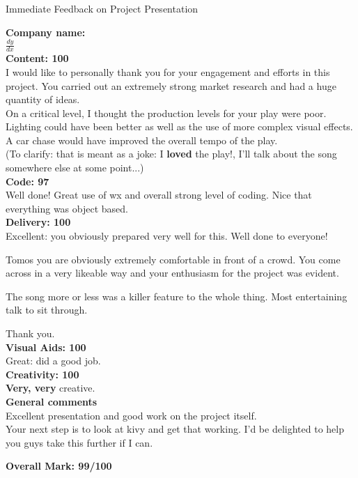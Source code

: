 \documentclass{article}
\begin{document}
\begin{center}
\Huge{Immediate Feedback on Project Presentation}\\
\end{center}


\normalsize
\textbf{Company name:}\\

$\frac{dy}{dx}$ \\

\textbf{Content: 100}\\

I would like to personally thank you for your engagement and efforts in this project.
You carried out an extremely strong market research and had a huge quantity of ideas.\\

On a critical level, I thought the production levels for your play were poor.
Lighting could have been better as well as the use of more complex visual effects.
A car chase would have improved the overall tempo of the play.\\

(To clarify: that is meant as a joke: I \textbf{loved} the play!, I'll talk about the song somewhere else at some point...)\\

\textbf{Code: 97}\\

Well done!
Great use of wx and overall strong level of coding.
Nice that everything was object based.\\

\textbf{Delivery: 100}\\

Excellent: you obviously prepared very well for this.
Well done to everyone!

Tomos you are obviously extremely comfortable in front of a crowd.
You come across in a very likeable way and your enthusiasm for the project was evident.

The song more or less was a killer feature to the whole thing.
Most entertaining talk to sit through.

Thank you.\\

\textbf{Visual Aids: 100}\\

Great: did a good job.\\

\textbf{Creativity: 100}\\

\textbf{Very, very} creative.\\

\textbf{General comments}\\

Excellent presentation and good work on the project itself.\\

Your next step is to look at kivy and get that working.
I'd be delighted to help you guys take this further if I can.

\textbf{Overall Mark: 99/100}
\end{document}

